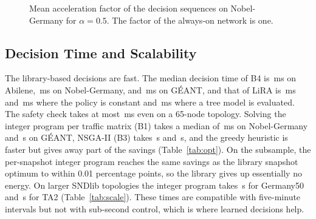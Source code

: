 \documentclass[journal]{IEEEtran}
\begin{document}
\begin{figure}[t]
\centering
{}
\caption{Mean acceleration factor of the decision sequences on Nobel-Germany for $\alpha=0.5$. The factor of the always-on network is one.}
\label{fig:wear}
\end{figure}

\subsection{Decision Time and Scalability}\label{sec:res-time}

The library-based decisions are fast. The median decision time of B4 is \abiLatBFour\,ms on Abilene, \nobLatBFour\,ms on Nobel-Germany, and \geaLatBFour\,ms on G\'{E}ANT, and that of LiRA is \abiLatLiRA\,ms and \nobLatLiRA\,ms where the policy is constant and \geaLatLiRA\,ms where a tree model is evaluated. The safety check takes at most \safetyTA\,ms even on a 65-node topology. Solving the integer program per traffic matrix (B1) takes a median of \nobIlpMs\,ms on Nobel-Germany and \ilpGeant\,s on G\'{E}ANT, NSGA-II (B3) takes \nobGaS\,s and \geaGaS\,s, and the greedy heuristic is faster but gives away part of the savings (Table~\ref{tab:opt}). On the subsample, the per-snapshot integer program reaches the same savings as the library snapshot optimum to within 0.01 percentage points, so the library gives up essentially no energy. On larger SNDlib topologies the integer program takes \ilpGermany\,s for Germany50 and \ilpTA\,s for TA2 (Table~\ref{tab:scale}). These times are compatible with five-minute intervals but not with sub-second control, which is where learned decisions help.
\end{document}
